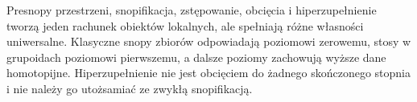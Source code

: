 \begin{uwaga}\label{cat:rem:infty-topos-scope}
Presnopy przestrzeni, snopifikacja, zstępowanie, obcięcia i hiperzupełnienie tworzą jeden rachunek obiektów lokalnych, ale spełniają różne własności uniwersalne. Klasyczne snopy zbiorów odpowiadają poziomowi zerowemu, stosy w grupoidach poziomowi pierwszemu, a dalsze poziomy zachowują wyższe dane homotopijne. Hiperzupełnienie nie jest obcięciem do żadnego skończonego stopnia i nie należy go utożsamiać ze zwykłą snopifikacją.
\end{uwaga}
